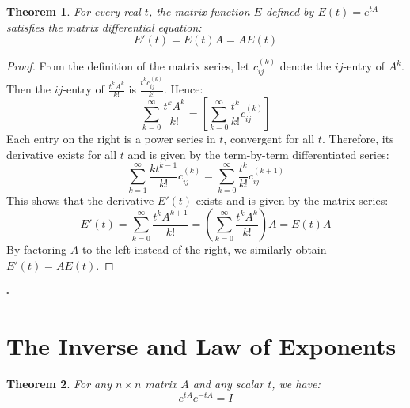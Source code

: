 \documentclass[12pt,a4paper]{report}
\newtheorem{theorem}{Theorem}[chapter]
\theoremstyle{definition}
\numberwithin{equation}{chapter}
\begin{document}
\begin{theorem}
For every real $t$, the matrix function $E$ defined by $E(t) = e^{tA}$ satisfies the matrix differential equation:
\begin{equation}
E'(t) = E(t)A = AE(t)
\end{equation}
\end{theorem}

\begin{proof}
From the definition of the matrix series, let $c_{ij}^{(k)}$ denote the $ij$-entry of $A^k$. Then the $ij$-entry of $\frac{t^k A^k}{k!}$ is $\frac{t^k c_{ij}^{(k)}}{k!}$. Hence:
\begin{equation}
\sum_{k=0}^\infty \frac{t^k A^k}{k!} = \left[ \sum_{k=0}^\infty \frac{t^k}{k!} c_{ij}^{(k)} \right]
\end{equation}
Each entry on the right is a power series in $t$, convergent for all $t$. Therefore, its derivative exists for all $t$ and is given by the term-by-term differentiated series:
\begin{equation}
\sum_{k=1}^\infty \frac{k t^{k-1}}{k!} c_{ij}^{(k)} = \sum_{k=0}^\infty \frac{t^k}{k!} c_{ij}^{(k+1)}
\end{equation}
This shows that the derivative $E'(t)$ exists and is given by the matrix series:
\begin{equation}
E'(t) = \sum_{k=0}^\infty \frac{t^k A^{k+1}}{k!} = \left( \sum_{k=0}^\infty \frac{t^k A^k}{k!} \right) A = E(t)A
\end{equation}
By factoring $A$ to the left instead of the right, we similarly obtain $E'(t) = AE(t)$.
\end{proof}
\hfill $\square$

\section{The Inverse and Law of Exponents}
\begin{theorem}
For any $n \times n$ matrix $A$ and any scalar $t$, we have:
\begin{equation}
e^{tA}e^{-tA} = I
\end{equation}
\end{theorem}
\end{document}
